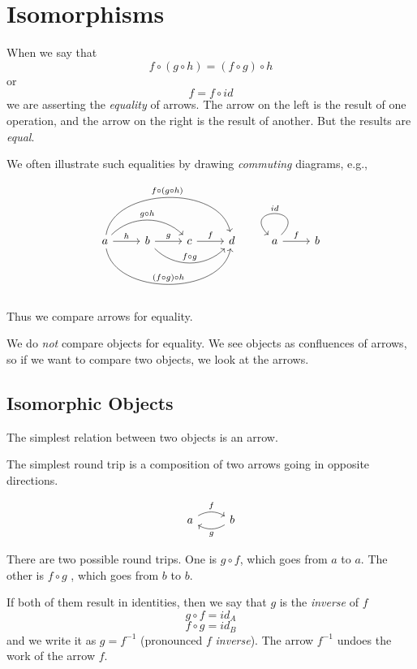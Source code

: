 \documentclass[DaoFP]{subfiles}
\begin{document}
\setcounter{chapter}{2}


\chapter{Isomorphisms}

When we say that 
\[f \circ (g \circ h) = (f \circ g) \circ h \]
or
\[ f = f \circ id \]
we are asserting the \emph{equality} of arrows. The arrow on the left is the result of one operation, and the arrow on the right is the result of another. But the results are \emph{equal}.

We often illustrate such equalities by drawing \emph{commuting} diagrams, e.g.,

\[
 \begin{tikzcd}
 a
 \arrow[r, "h"]
 \arrow[rr, bend left=45, "g \circ h"]
 \arrow[rrr, bend left=80, "f \circ (g \circ h)"]
 \arrow[rrr, bend right=80, "(f \circ g) \circ h"]
 & b
 \arrow[r, "g"]
 \arrow[rr, bend right=45, "f \circ g"]
 &c
 \arrow[r, "f"]
 &d
 \end{tikzcd}
 \begin{tikzcd}
 a
 \arrow[r, "f"]
 \arrow[r, loop, "id"']
 &b
 \end{tikzcd}
\]

Thus we compare arrows for equality.

We do \emph{not} compare objects for equality. We see objects as confluences of arrows, so if we want to compare two objects, we look at the arrows.

\section{Isomorphic Objects}

The simplest relation between two objects is an arrow.

The simplest round trip is a composition of two arrows going in opposite directions. 

\[
 \begin{tikzcd}
 a
 \arrow[r, bend left, "f"]
 & b
 \arrow[l, bend left, "g"]
 \end{tikzcd}
\]

There are two possible round trips. One is $g \circ f$, which goes from $a$ to $a$. The other is $f \circ g$ , which goes from $b$ to $b$.

If both of them result in identities, then we say that $g$ is the \emph{inverse} of $f$
\[ g \circ f = id_A\]
\[f \circ g = id_B\]
and we write it as $g = f^{-1}$ (pronounced $f$ \emph{inverse}). The arrow $ f^{-1}$ undoes the work of the arrow $f$. 
\end{document}
